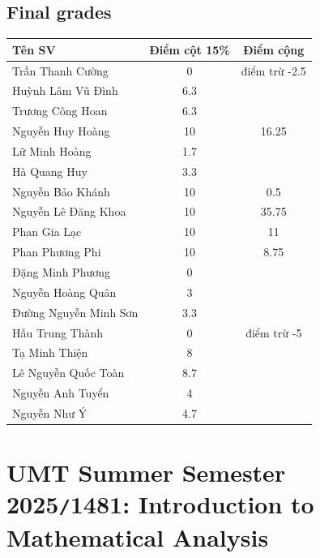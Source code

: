 \documentclass{article}
\begin{document}

\subsection{Final grades}

\begin{table}[H]
    \centering
    \begin{tabular}{|l|c|c|}
        \hline
        {\bf Tên SV} & {\bf Điểm cột 15\%} & {\bf Điểm cộng} \\
        \hline
        Trần Thanh Cường & 0 & điểm trừ -2.5 \\
        \hline
        Huỳnh Lâm Vũ Đình & 6.3 &  \\
        \hline
        Trương Công Hoan & 6.3 &  \\
        \hline
        Nguyễn Huy Hoàng & 10 & 16.25 \\
        \hline
        Lữ Minh Hoàng & 1.7 &  \\
        \hline
        Hà Quang Huy & 3.3 &  \\
        \hline
        Nguyễn Bảo Khánh & 10 & 0.5 \\
        \hline
        Nguyễn Lê Đăng Khoa & 10 & 35.75 \\
        \hline
        Phan Gia Lạc & 10 & 11 \\
        \hline
        Phan Phương Phi & 10 & 8.75 \\
        \hline
        Đặng Minh Phương & 0 &  \\
        \hline
        Nguyễn Hoàng Quân & 3 &  \\
        \hline
        Đường Nguyễn Minh Sơn & 3.3 &  \\
        \hline
        Hấu Trung Thành & 0 & điểm trừ -5 \\
        \hline
        Tạ Minh Thiện & 8 &  \\
        \hline
        Lê Nguyễn Quốc Toàn & 8.7 &  \\
        \hline
        Nguyễn Anh Tuyển & 4 &  \\
        \hline
        Nguyễn Như Ý & 4.7 &  \\
        \hline
    \end{tabular}
\end{table}


\section{UMT Summer Semester 2025{\tt/}1481: Introduction to Mathematical Analysis}
\end{document}
